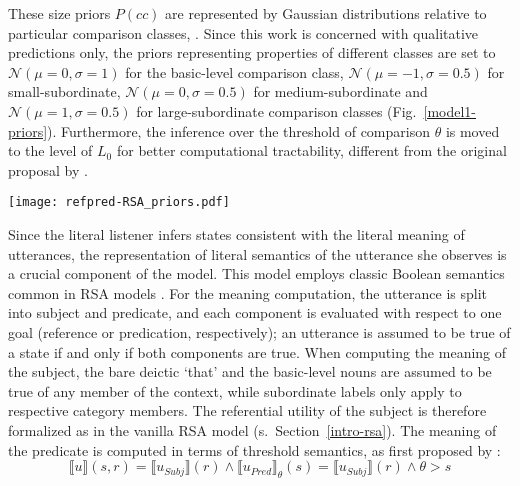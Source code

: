 These size priors $P(cc)$ are represented by Gaussian distributions relative to particular comparison classes, \textcite[as proposed by][]{tessler2017warm}. Since this work is concerned with qualitative predictions only, the priors representing properties of different classes are set to $\mathcal{N}(\mu = 0, \sigma = 1)$ for the basic-level comparison class, $\mathcal{N}(\mu = -1, \sigma = 0.5)$ for small-subordinate, $\mathcal{N}(\mu = 0, \sigma = 0.5)$ for medium-subordinate and $\mathcal{N}(\mu = 1, \sigma = 0.5)$ for large-subordinate comparison classes (Fig.~\ref{model1-priors}). 
Furthermore, the inference over the threshold of comparison $\theta$ is moved to the level of $L_0$ for better computational tractability, different from the original proposal by \textcite{lassiter2013context}.
\begin{figure*}[t]
	\begin{center}
		\texttt{[image: refpred-RSA\_priors.pdf]}
	\end{center}
	\vspace{-0.3cm}
	\caption{Hypothetical prior size distributions over a basic-level, a small-subordinate, a medium-subordinate and a large-subordinate category. These distributions were used for qualitative tests of the refpred-RSA model.}
	\label{model1-priors}
\end{figure*}

Since the literal listener infers states consistent with the literal meaning of utterances, the representation of literal semantics of the utterance she observes is a crucial component of the model. This model employs classic Boolean semantics common in RSA models \parencite{montague1973proper, problang}. For the meaning computation, the utterance is split into subject and predicate, and each component is evaluated with respect to one goal (reference or predication, respectively); an utterance is assumed to be true of a state if and only if both components are true.  When computing the meaning of the subject, the bare deictic `that' and the basic-level nouns are assumed to be true of any member of the context, while subordinate labels only apply to respective category members. The referential utility of the subject is therefore formalized as in the vanilla RSA model (s.~Section~\ref{intro-rsa}). The meaning of the predicate is computed in terms of threshold semantics, as first proposed by \textcite{lassiter2013context}: 
\begin{equation}
\llbracket u \rrbracket (s, r) = \llbracket u_{Subj} \rrbracket (r) \land \llbracket u_{Pred} \rrbracket_{\theta} (s) = \llbracket u_{Subj} \rrbracket (r) \land \theta > s
\end{equation}
  
